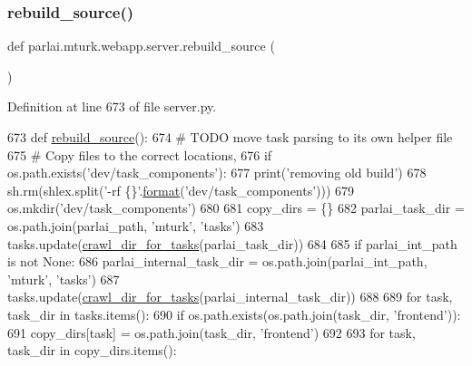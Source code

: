 \subsubsection{\texorpdfstring{rebuild\+\_\+source()}{rebuild\_source()}}
{\footnotesize\ttfamily def parlai.\+mturk.\+webapp.\+server.\+rebuild\+\_\+source (\begin{DoxyParamCaption}{ }\end{DoxyParamCaption})}



Definition at line 673 of file server.\+py.


\begin{DoxyCode}
673 \textcolor{keyword}{def }\hyperlink{namespaceparlai_1_1mturk_1_1webapp_1_1server_a0ce17c85e37b7734ab2fbaca711cb45f}{rebuild\_source}():
674     \textcolor{comment}{# TODO move task parsing to its own helper file}
675     \textcolor{comment}{# Copy files to the correct locations,}
676     \textcolor{keywordflow}{if} os.path.exists(\textcolor{stringliteral}{'dev/task\_components'}):
677         print(\textcolor{stringliteral}{'removing old build'})
678         sh.rm(shlex.split(\textcolor{stringliteral}{'-rf \{\}'}.\hyperlink{namespaceparlai_1_1chat__service_1_1services_1_1messenger_1_1shared__utils_a32e2e2022b824fbaf80c747160b52a76}{format}(\textcolor{stringliteral}{'dev/task\_components'})))
679     os.mkdir(\textcolor{stringliteral}{'dev/task\_components'})
680 
681     copy\_dirs = \{\}
682     parlai\_task\_dir = os.path.join(parlai\_path, \textcolor{stringliteral}{'mturk'}, \textcolor{stringliteral}{'tasks'})
683     tasks.update(\hyperlink{namespaceparlai_1_1mturk_1_1webapp_1_1server_a0f5381b2282125d20fe12c40f6ed2ad3}{crawl\_dir\_for\_tasks}(parlai\_task\_dir))
684 
685     \textcolor{keywordflow}{if} parlai\_int\_path \textcolor{keywordflow}{is} \textcolor{keywordflow}{not} \textcolor{keywordtype}{None}:
686         parlai\_internal\_task\_dir = os.path.join(parlai\_int\_path, \textcolor{stringliteral}{'mturk'}, \textcolor{stringliteral}{'tasks'})
687         tasks.update(\hyperlink{namespaceparlai_1_1mturk_1_1webapp_1_1server_a0f5381b2282125d20fe12c40f6ed2ad3}{crawl\_dir\_for\_tasks}(parlai\_internal\_task\_dir))
688 
689     \textcolor{keywordflow}{for} task, task\_dir \textcolor{keywordflow}{in} tasks.items():
690         \textcolor{keywordflow}{if} os.path.exists(os.path.join(task\_dir, \textcolor{stringliteral}{'frontend'})):
691             copy\_dirs[task] = os.path.join(task\_dir, \textcolor{stringliteral}{'frontend'})
692 
693     \textcolor{keywordflow}{for} task, task\_dir \textcolor{keywordflow}{in} copy\_dirs.items():

\end{DoxyCode}
